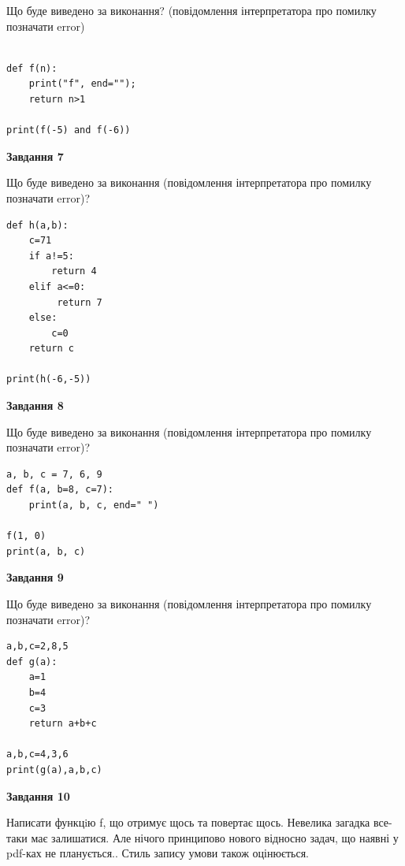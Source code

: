 \documentclass[12pt, ukrainian]{article}
\begin{document}
{\begin {large}
Що буде виведено за виконання? (повідомлення інтерпретатора про помилку позначати error)\par
\begin{verbatim}

def f(n):
    print("f", end="");
    return n>1

print(f(-5) and f(-6))
\end{verbatim}

{\begin {center}\textbf{Завдання 7}\end {center}}

Що буде виведено за виконання (повідомлення інтерпретатора про помилку позначати error)?\par
\begin{verbatim}
def h(a,b):
    c=71
    if a!=5:
        return 4
    elif a<=0:
         return 7
    else: 
        c=0
    return c

print(h(-6,-5))
\end{verbatim}

{\begin {center}\textbf{Завдання 8}\end {center}}

Що буде виведено за виконання (повідомлення інтерпретатора про помилку позначати error)?\par
\begin{verbatim}
a, b, c = 7, 6, 9
def f(a, b=8, c=7):
    print(a, b, c, end=" ")

f(1, 0)
print(a, b, c)
\end{verbatim}

{\begin {center}\textbf{Завдання 9}\end {center}}

Що буде виведено за виконання (повідомлення інтерпретатора про помилку позначати error)?\par
\begin{verbatim}
a,b,c=2,8,5
def g(a):
    a=1
    b=4
    c=3
    return a+b+c

a,b,c=4,3,6
print(g(a),a,b,c)
\end{verbatim}

{\begin {center}\textbf{Завдання 10}\end {center}}


Написати функцiю f, що отримує щось та повертає щось. Невелика загадка все-таки має залишатися. Але нічого принципово нового відносно задач, що наявні у pdf-ках не планується.. Стиль запису умови також оцінюється.\par
\end {large}}
\newpage
\end{document}
